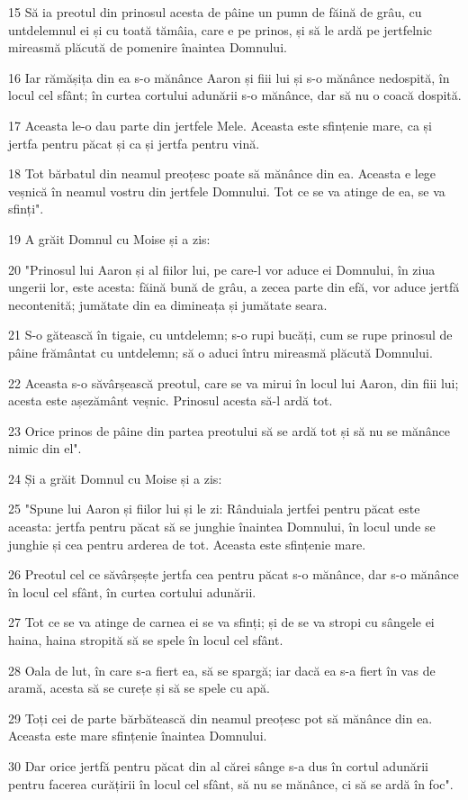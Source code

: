 \par 15 Să ia preotul din prinosul acesta de pâine un pumn de făină de grâu, cu untdelemnul ei și cu toată tămâia, care e pe prinos, și să le ardă pe jertfelnic mireasmă plăcută de pomenire înaintea Domnului.
\par 16 Iar rămășița din ea s-o mănânce Aaron și fiii lui și s-o mănânce nedospită, în locul cel sfânt; în curtea cortului adunării s-o mănânce, dar să nu o coacă dospită.
\par 17 Aceasta le-o dau parte din jertfele Mele. Aceasta este sfințenie mare, ca și jertfa pentru păcat și ca și jertfa pentru vină.
\par 18 Tot bărbatul din neamul preoțesc poate să mănânce din ea. Aceasta e lege veșnică în neamul vostru din jertfele Domnului. Tot ce se va atinge de ea, se va sfinți".
\par 19 A grăit Domnul cu Moise și a zis:
\par 20 "Prinosul lui Aaron și al fiilor lui, pe care-l vor aduce ei Domnului, în ziua ungerii lor, este acesta: făină bună de grâu, a zecea parte din efă, vor aduce jertfă necontenită; jumătate din ea dimineața și jumătate seara.
\par 21 S-o gătească în tigaie, cu untdelemn; s-o rupi bucăți, cum se rupe prinosul de pâine frământat cu untdelemn; să o aduci întru mireasmă plăcută Domnului.
\par 22 Aceasta s-o săvârșească preotul, care se va mirui în locul lui Aaron, din fiii lui; acesta este așezământ veșnic. Prinosul acesta să-l ardă tot.
\par 23 Orice prinos de pâine din partea preotului să se ardă tot și să nu se mănânce nimic din el".
\par 24 Și a grăit Domnul cu Moise și a zis:
\par 25 "Spune lui Aaron și fiilor lui și le zi: Rânduiala jertfei pentru păcat este aceasta: jertfa pentru păcat să se junghie înaintea Domnului, în locul unde se junghie și cea pentru arderea de tot. Aceasta este sfințenie mare.
\par 26 Preotul cel ce săvârșește jertfa cea pentru păcat s-o mănânce, dar s-o mănânce în locul cel sfânt, în curtea cortului adunării.
\par 27 Tot ce se va atinge de carnea ei se va sfinți; și de se va stropi cu sângele ei haina, haina stropită să se spele în locul cel sfânt.
\par 28 Oala de lut, în care s-a fiert ea, să se spargă; iar dacă ea s-a fiert în vas de aramă, acesta să se curețe și să se spele cu apă.
\par 29 Toți cei de parte bărbătească din neamul preoțesc pot să mănânce din ea. Aceasta este mare sfințenie înaintea Domnului.
\par 30 Dar orice jertfă pentru păcat din al cărei sânge s-a dus în cortul adunării pentru facerea curățirii în locul cel sfânt, să nu se mănânce, ci să se ardă în foc".


